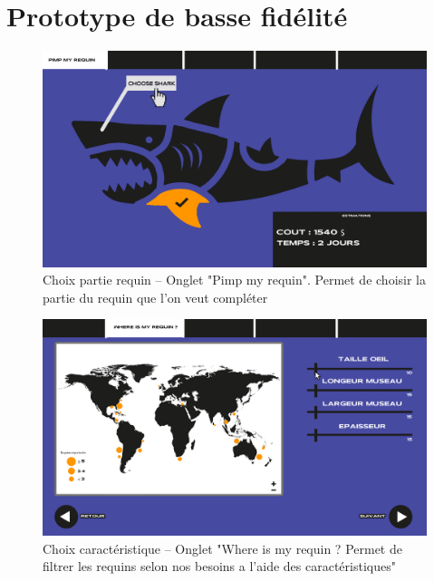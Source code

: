 \documentclass{article}
\begin{document}
\newpage
\section{Prototype de basse fidélité}

\begin{figure}[!h]
	\centering
	\includegraphics[width=14.4cm]{assets/prototype/basse/onglet1}
	\caption{Choix partie requin – Onglet "Pimp my requin". Permet de choisir la partie du requin que l'on veut compléter}
	\label{onglet1}
\end{figure}

\vspace{0.3cm}

\begin{figure}[!h]
	\centering
	\includegraphics[width=14.4cm]{assets/prototype/basse/onglet2}
	\caption{ Choix caractéristique – Onglet "Where is my requin ? Permet de filtrer les requins selon nos besoins a l'aide des caractéristiques"}
	\label{onglet2}
\end{figure}
\end{document}
